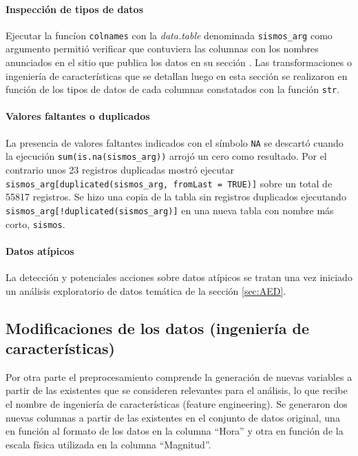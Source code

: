 \documentclass[a4paper]{report}
\begin{document}
\paragraph{Inspección de tipos de datos}
Ejecutar la funcíon \verb'colnames' con la \emph{data.table} denominada \verb'sismos_arg' como argumento permitió verificar que contuviera las columnas con los nombres anunciados en el sitio que publica los datos en su sección \cite[Exploración inicial]{daniela_parada_ic-datasets-docencia_nodate}.
Las transformaciones o ingeniería de características que se detallan luego en esta sección se realizaron en función de los tipos de datos de cada columnas constatados con la función \verb'str'.


\paragraph{Valores faltantes o duplicados}
La presencia de valores faltantes indicados con el símbolo \verb'NA' se descartó cuando la ejecución \verb'sum(is.na(sismos_arg))' arrojó un cero como resultado.
Por el contrario unos \num{23} registros duplicadas mostró
ejecutar \verb'sismos_arg[duplicated(sismos_arg, fromLast = TRUE)]' sobre un total de \num{55817} registros.
Se hizo una copia de la tabla sin registros duplicados ejecutando \verb'sismos_arg[!duplicated(sismos_arg)]' en una nueva tabla con nombre más corto, \verb'sismos'.


\paragraph{Datos atípicos}
La detección y potenciales acciones sobre datos atípicos se tratan una vez iniciado un análisis exploratorio de datos temática de la sección \ref{sec:AED}.\\


\subsection{Modificaciones de los datos (ingeniería de características)}

Por otra parte el preprocesamiento comprende la generación de nuevas variables a partir de las existentes que se consideren relevantes para el análisis, lo que recibe el nombre de ingeniería de características (feature engineering).
Se generaron dos nuevas columnas a partir de las existentes en el conjunto de datos original, una en función al formato de los datos en la columna ``Hora'' y otra en función de la escala física utilizada en la columna ``Magnitud''.
\end{document}
